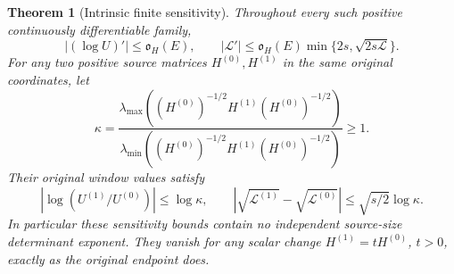 \documentclass[11pt]{article}
\newtheorem{theorem}{Theorem}[section]
\begin{document}
\begin{theorem}[Intrinsic finite sensitivity]
Throughout every such positive continuously differentiable family,
\[
 \boxed{|(\log U)'|\le\mathfrak o_H(E),\qquad
 |\mathscr L'|\le\mathfrak o_H(E)
             \min\{2s,\sqrt{2s\mathscr L}\}.}                \tag{EW.33}
\]
For any two positive source matrices $H^{(0)},H^{(1)}$ in the
same original coordinates, let
\[
 \kappa=\frac{\lambda_{\max}((H^{(0)})^{-1/2}H^{(1)}(H^{(0)})^{-1/2})}
                   {\lambda_{\min}((H^{(0)})^{-1/2}H^{(1)}(H^{(0)})^{-1/2})}
 \ge1.
                                                               \tag{EW.34}
\]
Their original window values satisfy
\[
 \boxed{|\log(U^{(1)}/U^{(0)})|\le\log\kappa,\qquad
 |\sqrt{\mathscr L^{(1)}}-\sqrt{\mathscr L^{(0)}}|
                  \le\sqrt{s/2}\log\kappa.}                 \tag{EW.35}
\]
In particular these sensitivity bounds contain no independent
source-size determinant exponent. They vanish for any scalar change
$H^{(1)}=tH^{(0)}$, $t>0$, exactly as the original endpoint does.
\end{theorem}
\end{document}
